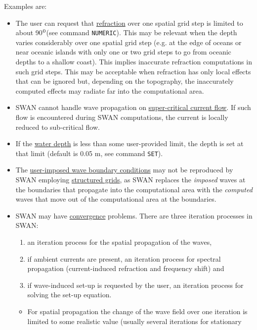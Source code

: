 \documentclass[12pt]{book}
\begin{document}
Examples are:
\begin{itemize}
  \item The user can request that \underline{refraction} over one spatial grid step is limited to about
        90$^{{\rm 0}}$(see command {\tt NUMERIC}). This may be relevant when the depth varies considerably
        over one spatial grid step (e.g. at the edge of oceans or near oceanic islands with only
        one or two grid steps to go from oceanic depths to a shallow coast). This implies
        inaccurate refraction computations in such grid steps. This may be acceptable when
        refraction has only local effects that can be ignored but, depending on the topography,
        the inaccurately computed effects may radiate far into the computational area.
  \item SWAN cannot handle wave propagation on \underline{super-critical current flow}. If such flow is
        encountered during SWAN computations, the current is locally reduced to sub-critical flow.
  \item If the \underline{water depth} is less than some user-provided limit, the depth is set at that limit
        (default is 0.05 m, see command {\tt SET}).
  \item The \underline{user-imposed wave boundary conditions} may not be reproduced by SWAN employing
        \underline {structured grids}, as SWAN replaces the {\it imposed} waves at the boundaries that
        propagate into the computational area with the {\it computed} waves that move out of  the computational
        area at the boundaries.
  \item SWAN may have \underline{convergence} problems. There are three iteration processes in SWAN:
        \begin{enumerate}
           \item an iteration process for the spatial propagation of the waves,
           \item if ambient currents are present, an iteration process for spectral propagation
                 (current-induced refraction and frequency shift) and
           \item if wave-induced set-up is requested by the user, an iteration process for
                 solving the set-up equation.
        \end{enumerate}
        \begin{itemize}
           \item[ad 1] For spatial propagation the change of the wave field over one iteration is
                       limited to some realistic value (usually several iterations for stationary

\end{itemize}
\end{itemize}
\end{document}

